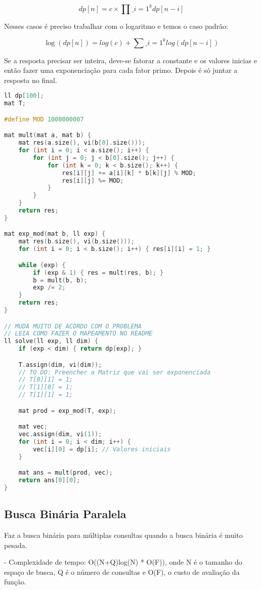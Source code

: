 \documentclass[11pt, a4paper, twoside]{article}
\begin{document}
$$ dp[n] =  c\times \prod\_{i=1}^{k} dp[n-i] $$

Nesses casos é preciso trabalhar com o logaritmo e temos o caso padrão:


$$ \log(dp[n]) =  log(c) + \sum\_{i=1}^{k} log(dp[n-i]) $$

Se a resposta precisar ser inteira, deve-se fatorar a constante e os valores inicias e então fazer uma exponenciação para cada fator primo. Depois é só juntar a resposta no final.

\begin{lstlisting}[language=C++]
ll dp[100];
mat T;

#define MOD 1000000007

mat mult(mat a, mat b) {
    mat res(a.size(), vi(b[0].size()));
    for (int i = 0; i < a.size(); i++) {
        for (int j = 0; j < b[0].size(); j++) {
            for (int k = 0; k < b.size(); k++) {
                res[i][j] += a[i][k] * b[k][j] % MOD;
                res[i][j] %= MOD;
            }
        }
    }
    return res;
}

mat exp_mod(mat b, ll exp) {
    mat res(b.size(), vi(b.size()));
    for (int i = 0; i < b.size(); i++) { res[i][i] = 1; }

    while (exp) {
        if (exp & 1) { res = mult(res, b); }
        b = mult(b, b);
        exp /= 2;
    }
    return res;
}

// MUDA MUITO DE ACORDO COM O PROBLEMA
// LEIA COMO FAZER O MAPEAMENTO NO README
ll solve(ll exp, ll dim) {
    if (exp < dim) { return dp[exp]; }

    T.assign(dim, vi(dim));
    // TO DO: Preencher a Matriz que vai ser exponenciada
    // T[0][1] = 1;
    // T[1][0] = 1;
    // T[1][1] = 1;

    mat prod = exp_mod(T, exp);

    mat vec;
    vec.assign(dim, vi(1));
    for (int i = 0; i < dim; i++) {
        vec[i][0] = dp[i]; // Valores iniciais
    }

    mat ans = mult(prod, vec);
    return ans[0][0];
}\end{lstlisting}

\subsection{Busca Binária Paralela}


Faz a busca binária para múltiplas consultas quando a busca binária é muito pesada.


- Complexidade de tempo: O((N+Q)log(N) * O(F)), onde N é o tamanho do espaço de busca, Q é o número de consultas e O(F), o custo de avaliação da função.
\end{document}
